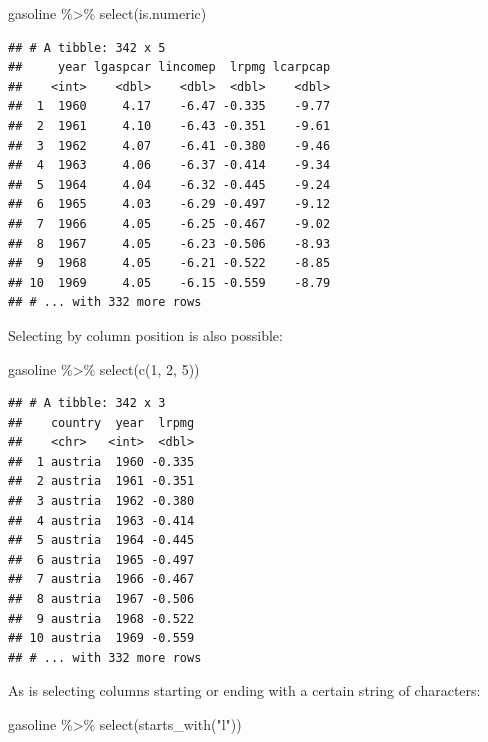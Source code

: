 \documentclass[
]{article}
\newenvironment{Shaded}{\begin{snugshade}}{\end{snugshade}}
\newcommand{\DecValTok}[1]{\textcolor[rgb]{0.00,0.00,0.81}{#1}}
\newcommand{\FunctionTok}[1]{\textcolor[rgb]{0.00,0.00,0.00}{#1}}
\newcommand{\NormalTok}[1]{#1}
\newcommand{\SpecialCharTok}[1]{\textcolor[rgb]{0.00,0.00,0.00}{#1}}
\newcommand{\StringTok}[1]{\textcolor[rgb]{0.31,0.60,0.02}{#1}}
\begin{document}
\begin{Shaded}
\begin{Highlighting}[]
\NormalTok{gasoline }\SpecialCharTok{\%\textgreater{}\%}
  \FunctionTok{select}\NormalTok{(is.numeric)}
\end{Highlighting}
\end{Shaded}

\begin{verbatim}
## # A tibble: 342 x 5
##     year lgaspcar lincomep  lrpmg lcarpcap
##    <int>    <dbl>    <dbl>  <dbl>    <dbl>
##  1  1960     4.17    -6.47 -0.335    -9.77
##  2  1961     4.10    -6.43 -0.351    -9.61
##  3  1962     4.07    -6.41 -0.380    -9.46
##  4  1963     4.06    -6.37 -0.414    -9.34
##  5  1964     4.04    -6.32 -0.445    -9.24
##  6  1965     4.03    -6.29 -0.497    -9.12
##  7  1966     4.05    -6.25 -0.467    -9.02
##  8  1967     4.05    -6.23 -0.506    -8.93
##  9  1968     4.05    -6.21 -0.522    -8.85
## 10  1969     4.05    -6.15 -0.559    -8.79
## # ... with 332 more rows
\end{verbatim}

Selecting by column position is also possible:

\begin{Shaded}
\begin{Highlighting}[]
\NormalTok{gasoline }\SpecialCharTok{\%\textgreater{}\%}
  \FunctionTok{select}\NormalTok{(}\FunctionTok{c}\NormalTok{(}\DecValTok{1}\NormalTok{, }\DecValTok{2}\NormalTok{, }\DecValTok{5}\NormalTok{))}
\end{Highlighting}
\end{Shaded}

\begin{verbatim}
## # A tibble: 342 x 3
##    country  year  lrpmg
##    <chr>   <int>  <dbl>
##  1 austria  1960 -0.335
##  2 austria  1961 -0.351
##  3 austria  1962 -0.380
##  4 austria  1963 -0.414
##  5 austria  1964 -0.445
##  6 austria  1965 -0.497
##  7 austria  1966 -0.467
##  8 austria  1967 -0.506
##  9 austria  1968 -0.522
## 10 austria  1969 -0.559
## # ... with 332 more rows
\end{verbatim}

As is selecting columns starting or ending with a certain string of characters:

\begin{Shaded}
\begin{Highlighting}[]
\NormalTok{gasoline }\SpecialCharTok{\%\textgreater{}\%}
  \FunctionTok{select}\NormalTok{(}\FunctionTok{starts\_with}\NormalTok{(}\StringTok{"l"}\NormalTok{))}
\end{Highlighting}
\end{Shaded}
\end{document}
